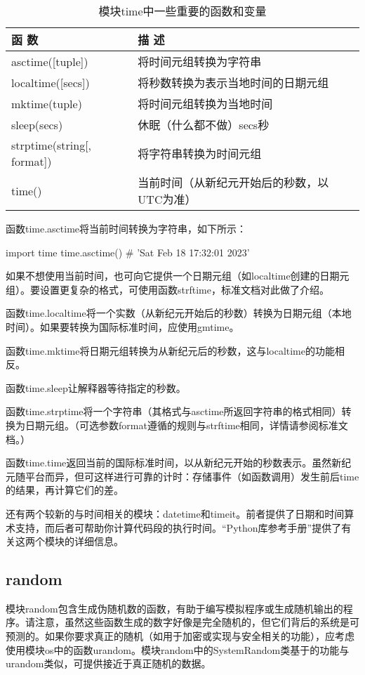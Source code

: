 \begin{table}[H]
    \centering
    \caption{模块time中一些重要的函数和变量}
    \label{time}
    \begin{tabular}{lll}
        \hline
        函 数                        & 描 述                     \\
        \hline
        asctime([tuple])           & 将时间元组转换为字符串             \\
        localtime([secs])          & 将秒数转换为表示当地时间的日期元组       \\
        mktime(tuple)              & 将时间元组转换为当地时间            \\
        sleep(secs)                & 休眠（什么都不做）secs秒          \\
        strptime(string[, format]) & 将字符串转换为时间元组             \\
        time()                     & 当前时间（从新纪元开始后的秒数，以UTC为准） \\
        \hline
    \end{tabular}
\end{table}
函数time.asctime将当前时间转换为字符串，如下所示：
\begin{pyc}
import time
time.asctime()  # 'Sat Feb 18 17:32:01 2023'
\end{pyc}

如果不想使用当前时间，也可向它提供一个日期元组（如localtime创建的日期元组）。要设置更复杂的格式，可使用函数strftime，标准文档对此做了介绍。

函数time.localtime将一个实数（从新纪元开始后的秒数）转换为日期元组（本地时间）。如果要转换为国际标准时间，应使用gmtime。

函数time.mktime将日期元组转换为从新纪元后的秒数，这与localtime的功能相反。

函数time.sleep让解释器等待指定的秒数。

函数time.strptime将一个字符串（其格式与asctime所返回字符串的格式相同）转换为日期元组。（可选参数format遵循的规则与strftime相同，详情请参阅标准文档。）

函数time.time返回当前的国际标准时间，以从新纪元开始的秒数表示。虽然新纪元随平台而异，但可这样进行可靠的计时：存储事件（如函数调用）发生前后time的结果，再计算它们的差。

还有两个较新的与时间相关的模块：datetime和timeit。前者提供了日期和时间算术支持，而后者可帮助你计算代码段的执行时间。“Python库参考手册”提供了有关这两个模块的详细信息。
\subsection{random}
模块random包含生成伪随机数的函数，有助于编写模拟程序或生成随机输出的程序。请注意，虽然这些函数生成的数字好像是完全随机的，但它们背后的系统是可预测的。如果你要求真正的随机（如用于加密或实现与安全相关的功能），应考虑使用模块os中的函数urandom。模块random中的SystemRandom类基于的功能与urandom类似，可提供接近于真正随机的数据。


